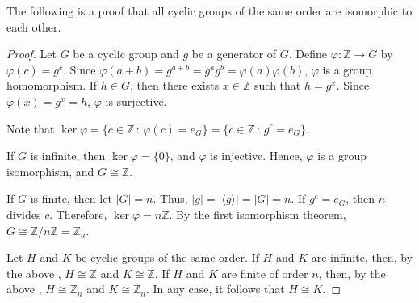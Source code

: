\documentclass[12pt]{article}
\begin{document}
The following is a proof that all cyclic groups of the same order are isomorphic to each other.

\begin{proof}
Let $G$ be a cyclic group and $g$ be a generator of $G$.  Define $\varphi \colon {\mathbb Z} \to G$ by $\varphi (c)=g^c$.  Since $\varphi(a+b)=g^{a+b}=g^ag^b=\varphi(a)\varphi(b)$, $\varphi$ is a group homomorphism.  If $h \in G$, then there exists $x \in {\mathbb Z}$ such that $h=g^x$.  Since $\varphi (x)=g^x=h$, $\varphi$ is surjective.

Note that $\ker \varphi =\{c \in {\mathbb Z}\, : \, \varphi(c)=e_G\}=\{c \in {\mathbb Z}\, : \, g^c=e_G\}$.

If $G$ is infinite, then $\ker \varphi = \{0\}$, and $\varphi$ is injective.  Hence, $\varphi$ is a group isomorphism, and $G \cong {\mathbb Z}$.

If $G$ is finite, then let $|G|=n$.  Thus, $|g|=|\langle g \rangle |=|G|=n$.  If $g^c=e_G$, then $n$ divides $c$.  Therefore, $\ker \varphi =n{\mathbb Z}$.  By the first isomorphism theorem, $G \cong \mathbb{Z}/n\mathbb{Z}=\mathbb{Z}_n$.

Let $H$ and $K$ be cyclic groups of the same order.  If $H$ and $K$ are infinite, then, by the above , $H \cong {\mathbb Z}$ and $K \cong {\mathbb Z}$.  If $H$ and $K$ are finite of order $n$, then, by the above , $H \cong {\mathbb Z}_n$ and $K \cong {\mathbb Z}_n$.  In any case, it follows that $H \cong K$.
\end{proof}
\end{document}
